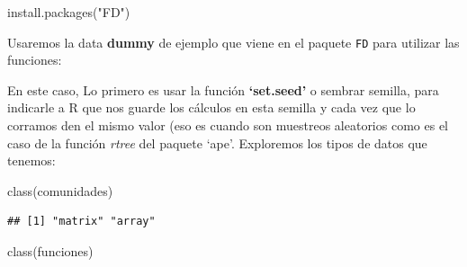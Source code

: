 \documentclass[
]{article}
\newenvironment{Shaded}{\begin{snugshade}}{\end{snugshade}}
\newcommand{\AttributeTok}[1]{\textcolor[rgb]{0.77,0.63,0.00}{#1}}
\newcommand{\DecValTok}[1]{\textcolor[rgb]{0.00,0.00,0.81}{#1}}
\newcommand{\FunctionTok}[1]{\textcolor[rgb]{0.00,0.00,0.00}{#1}}
\newcommand{\NormalTok}[1]{#1}
\newcommand{\OtherTok}[1]{\textcolor[rgb]{0.56,0.35,0.01}{#1}}
\newcommand{\SpecialCharTok}[1]{\textcolor[rgb]{0.00,0.00,0.00}{#1}}
\newcommand{\StringTok}[1]{\textcolor[rgb]{0.31,0.60,0.02}{#1}}
\begin{document}
\begin{Shaded}
\begin{Highlighting}[]
\FunctionTok{install.packages}\NormalTok{(}\StringTok{"FD"}\NormalTok{)}
\end{Highlighting}
\end{Shaded}

Usaremos la data \textbf{dummy} de ejemplo que viene en el paquete
\texttt{FD} para utilizar las funciones:

\begin{Shaded}
\end{Shaded}

En este caso, Lo primero es usar la función \textbf{`set.seed'} o
sembrar semilla, para indicarle a R que nos guarde los cálculos en esta
semilla y cada vez que lo corramos den el mismo valor (eso es cuando son
muestreos aleatorios como es el caso de la función \emph{rtree} del
paquete `ape'. Exploremos los tipos de datos que tenemos:

\begin{Shaded}
\begin{Highlighting}[]
\FunctionTok{class}\NormalTok{(comunidades)}
\end{Highlighting}
\end{Shaded}

\begin{verbatim}
## [1] "matrix" "array"
\end{verbatim}

\begin{Shaded}
\begin{Highlighting}[]
\FunctionTok{class}\NormalTok{(funciones)}
\end{Highlighting}
\end{Shaded}
\end{document}
